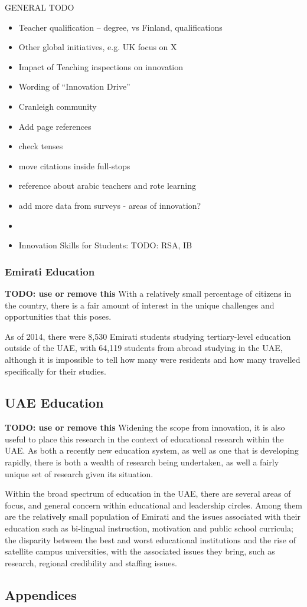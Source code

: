 GENERAL TODO
\begin{itemize}
\item Teacher qualification – degree, vs Finland, qualifications
\item Other global initiatives, e.g. UK focus on X
\item Impact of Teaching inspections on innovation
\item Wording of “Innovation Drive”
\item Cranleigh community
\item Add page references
\item check tenses
\item move citations inside full-stops
\item reference about arabic teachers and rote learning
\item add more data from surveys - areas of innovation?
\item \cite{Cordingley2007}
\item Innovation Skills for Students: TODO: RSA, IB
\end{itemize}

\subsubsection{Emirati Education} \textbf{TODO: use or remove this}
With a relatively small percentage of citizens in the country, there is a fair amount of interest in the unique challenges and opportunities that this poses.

As of 2014, there were 8,530 Emirati students studying tertiary-level education outside of the UAE, with 64,119 students from abroad studying in the UAE, although it is impossible to tell how many were residents and how many travelled specifically for their studies.

\subsection{UAE Education} \textbf{TODO: use or remove this}
Widening the scope from innovation, it is also useful to place this research in the context of educational research within the UAE. As both a recently new education system, as well as one that is developing rapidly, there is both a wealth of research being undertaken, as well a fairly unique set of research given its situation.

Within the broad spectrum of education in the UAE, there are several areas of focus, and general concern within educational and leadership circles. Among them are the relatively small population of Emirati and the issues associated with their education such as bi-lingual instruction, motivation and public school curricula; the disparity between the best and worst educational institutions and the rise of satellite campus universities, with the associated issues they bring, such as research, regional credibility and staffing issues.

\subsection{Appendices}

